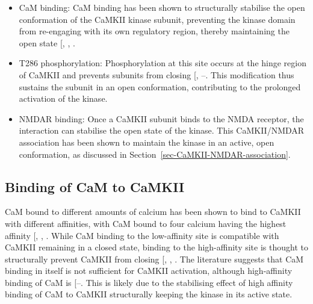 \documentclass[
  11pt,
  letterpaper,
]{scrreprt}
\providecommand{\tightlist}{%
  \setlength{\itemsep}{0pt}\setlength{\parskip}{0pt}}\usepackage{longtable,booktabs,array}
\begin{document}
\begin{itemize}
\tightlist
\item
  CaM binding: CaM binding has been shown to structurally stabilise the
  open conformation of the CaMKII kinase subunit, preventing the kinase
  domain from re-engaging with its own regulatory region, thereby
  maintaining the open state
  {[},
  ,
  \citeproc{ref-gaertner2004Comparative}{179}{]}.
\item
  T286 phosphorylation: Phosphorylation at this site occurs at the hinge
  region of CaMKII and prevents subunits from closing
  {[},
  --\citeproc{ref-buard2010CaMKII}{189}{]}.
  This modification thus sustains the subunit in an open conformation,
  contributing to the prolonged activation of the kinase.
\item
  NMDAR binding: Once a CaMKII subunit binds to the NMDA receptor, the
  interaction can stabilise the open state of the kinase. This
  CaMKII/NMDAR association has been shown to maintain the kinase in an
  active, open conformation, as discussed in
  Section~\ref{sec-CaMKII-NMDAR-association}.
\end{itemize}

\subsection{Binding of CaM to CaMKII}\label{sec-binding-cam-camkii}

CaM bound to different amounts of calcium has been shown to bind to
CaMKII with different affinities, with CaM bound to four calcium having
the highest affinity {[},
,
\citeproc{ref-khan2024Realtimea}{461}{]}. While CaM binding to the
low-affinity site is compatible with CaMKII remaining in a closed state,
binding to the high-affinity site is thought to structurally prevent
CaMKII from closing {[},
,
\citeproc{ref-gaertner2004Comparative}{179}{]}. The literature suggests
that CaM binding in itself is not sufficient for CaMKII activation,
although high-affinity binding of CaM is
{[}--\citeproc{ref-bossuyt2013Visualizing}{464}{]}.
This is likely due to the stabilising effect of high affinity binding of
CaM to CaMKII structurally keeping the kinase in its active state.
\end{document}
